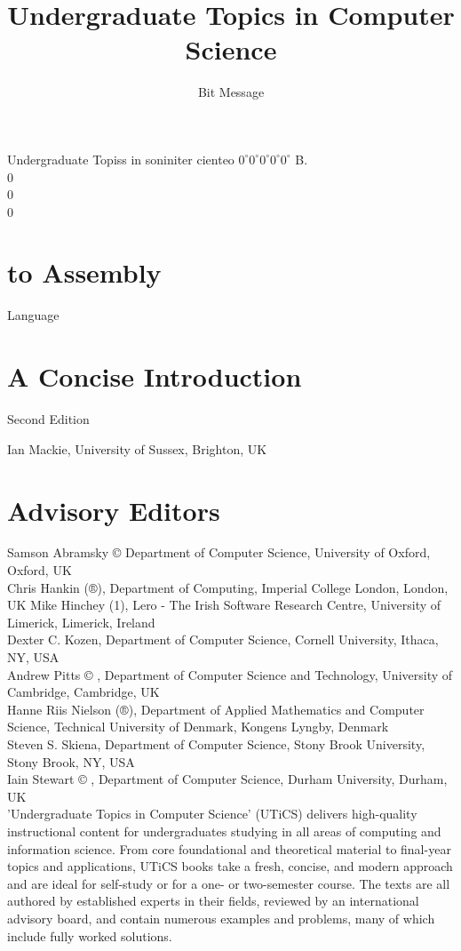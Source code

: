 \documentclass[10pt]{book}
\title{Undergraduate Topics in Computer Science }
\author{Bit Message}
\date{}
\begin{document}
\tableofcontents


\maketitle
Undergraduate Topiss in soniniter cienteo $0^{\circ} 0^{\circ} 0^{\circ} 0^{\circ} 0^{\circ}$ B.\\
0\\
0\\
0

\section{to Assembly}
 Language\section{A Concise Introduction}
Second Edition


Ian Mackie, University of Sussex, Brighton, UK

\section{Advisory Editors}
Samson Abramsky © Department of Computer Science, University of Oxford, Oxford, UK\\
Chris Hankin (®), Department of Computing, Imperial College London, London, UK Mike Hinchey (1), Lero - The Irish Software Research Centre, University of Limerick, Limerick, Ireland\\
Dexter C. Kozen, Department of Computer Science, Cornell University, Ithaca, NY, USA\\
Andrew Pitts © , Department of Computer Science and Technology, University of Cambridge, Cambridge, UK\\
Hanne Riis Nielson (®), Department of Applied Mathematics and Computer Science, Technical University of Denmark, Kongens Lyngby, Denmark\\
Steven S. Skiena, Department of Computer Science, Stony Brook University, Stony Brook, NY, USA\\
Iain Stewart © , Department of Computer Science, Durham University, Durham, UK\\

'Undergraduate Topics in Computer Science' (UTiCS) delivers high-quality instructional content for undergraduates studying in all areas of computing and information science. From core foundational and theoretical material to final-year topics and applications, UTiCS books take a fresh, concise, and modern approach and are ideal for self-study or for a one- or two-semester course. The texts are all authored by established experts in their fields, reviewed by an international advisory board, and contain numerous examples and problems, many of which include fully worked solutions.
\end{document}
